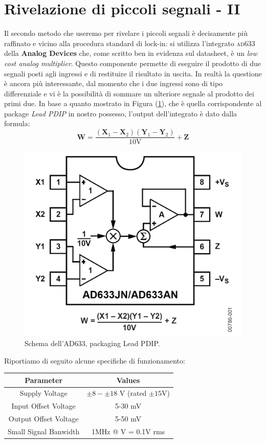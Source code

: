 \documentclass[10pt,letterpaper]{article}
\begin{document}
\section{Rivelazione di piccoli segnali - II}
Il secondo metodo che useremo per rivelare i piccoli segnali è decisamente più raffinato e vicino alla procedura standard di lock-in: si utilizza l'integrato \textsc{ad633} della \textbf{Analog Devices} che, come scritto ben in evidenza sul datasheet, è un \textit{low cost analog multiplier}. Questo componente permette di eseguire il prodotto di due segnali posti agli ingressi e di restituire il risultato in uscita. In realtà la questione è ancora più interessante, dal momento che i due ingressi sono di tipo differenziale e vi è la possibilità di sommare un ulteriore segnale al prodotto dei primi due. In base a quanto mostrato in Figura (\ref{fig:schema_ad633}), che è quella corrispondente al package \textit{Lead PDIP} in nostro possesso, l'output dell'integrato è dato dalla formula:\\

\begin{equation}
\textbf{W} = \frac{(\textbf{X}_1 - \textbf{X}_2)(\textbf{Y}_1 - \textbf{Y}_2)}{10\mathrm{V}} + \textbf{Z}
\end{equation}

\begin{figure}
\centering
\includegraphics[width=0.4\linewidth]{./schema_ad633}
\caption{Schema dell'AD633, packaging Lead PDIP.}
\label{fig:schema_ad633}
\end{figure}


Riportiamo di seguito alcune specifiche di funzionamento:

\begin{table}
\centering
\begin{tabular}{c|c}
\hline \textbf{Parameter} & \textbf{Values} \\ 
\hline Supply Voltage & $\pm 8 - \pm 18$ V (rated $\pm 15$V) \\ 
 Input Offset Voltage & 5-30 mV \\ 
 Output Offset Voltage & 5-50 mV \\  
 Small Signal Banwidth & 1MHz @ V = 0.1V rms \\
\hline
\end{tabular} 
\end{table}
~\\
\end{document}
